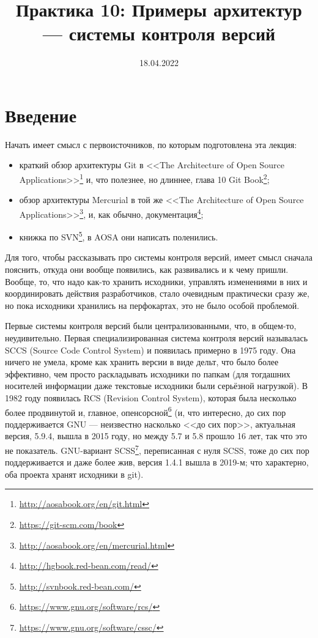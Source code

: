 \documentclass[a5paper]{article}
\title{Практика 10: Примеры архитектур --- системы контроля версий}
\date{18.04.2022}
\begin{document}
\maketitle
\thispagestyle{empty}

\section{Введение}

Начать имеет смысл с первоисточников, по которым подготовлена эта лекция:
\begin{itemize}
    \item краткий обзор архитектуры Git в <<The Architecture of Open Source Applications>>\footnote{\url{http://aosabook.org/en/git.html}} и, что полезнее, но длиннее, глава 10 Git Book\footnote{\url{https://git-scm.com/book}};
    \item обзор архитектуры Mercurial в той же <<The Architecture of Open Source Applications>>\footnote{\url{http://aosabook.org/en/mercurial.html}}, и, как обычно, документация\footnote{\url{http://hgbook.red-bean.com/read/}};
    \item книжка по SVN\footnote{\url{http://svnbook.red-bean.com/}}, в AOSA они написать поленились.
\end{itemize}

Для того, чтобы рассказывать про системы контроля версий, имеет смысл сначала пояснить, откуда они вообще появились, как развивались и к чему пришли. Вообще, то, что надо как-то хранить исходники, управлять изменениями в них и координировать действия разработчиков, стало очевидным практически сразу же, но пока исходники хранились на перфокартах, это не было особой проблемой.

Первые системы контроля версий были централизованными, что, в общем-то, неудивительно. Первая специализированная система контроля версий называлась SCCS (Source Code Control System) и появилась примерно в 1975 году. Она ничего не умела, кроме как хранить версии в виде дельт, что было более эффективно, чем просто раскладывать исходники по папкам (для тогдашних носителей информации даже текстовые исходники были серьёзной нагрузкой). В 1982 году появилась RCS (Revision Control System), которая была несколько более продвинутой и, главное, опенсорсной\footnote{\url{https://www.gnu.org/software/rcs/}} (и, что интересно, до сих пор поддерживается GNU --- неизвестно насколько <<до сих пор>>, актуальная версия, 5.9.4, вышла в 2015 году, но между 5.7 и 5.8 прошло 16 лет, так что это не показатель. GNU-вариант SCSS\footnote{\url{https://www.gnu.org/software/cssc/}}, переписанная с нуля SCSS, тоже до сих пор поддерживается и даже более жив, версия 1.4.1 вышла в 2019-м; что характерно, оба проекта хранят исходники в git).
\end{document}
